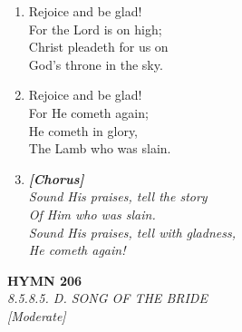 \begin{enumerate}
    \item Rejoice and be glad! \\
        For the Lord is on high; \\
        Christ pleadeth for us on \\
        God's throne in the sky.

    \item Rejoice and be glad! \\
        For He cometh again; \\
        He cometh in glory, \\
        The Lamb who was slain.

    \item[] \vspace{0.4em}
    \textbf{\textit{[Chorus]}} \\
    \textit{Sound His praises, tell the story} \\
    \textit{    Of Him who was slain.} \\
    \textit{Sound His praises, tell with gladness,} \\
    \textit{    He cometh again!}
    \vspace{0.4em}

\end{enumerate}

\newpage
\begin{center}
    {\Large \textbf{HYMN 206}}
    \\
    \textit{8.5.8.5. D. SONG OF THE BRIDE}
    \\
    \textit{\small [Moderate]}
\end{center}
\vspace{1em}

